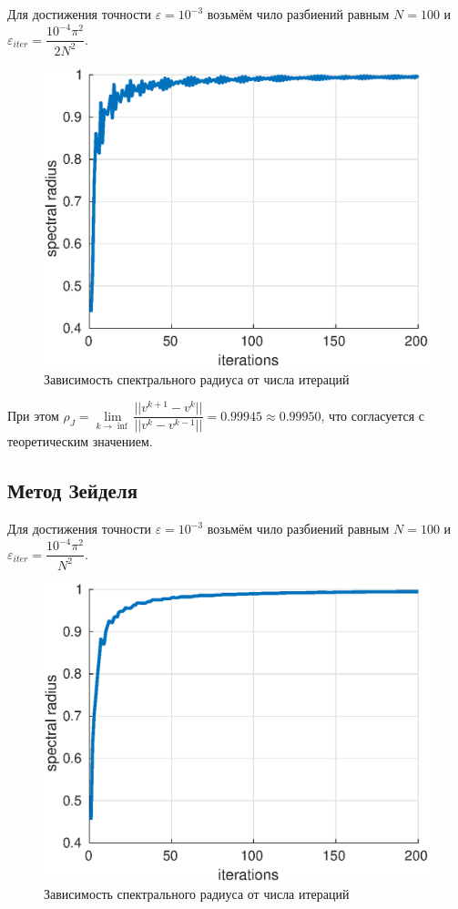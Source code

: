 \documentclass[12pt]{article}
\begin{document}
Для достижения точности $\varepsilon = 10^{-3}$ возьмём чило разбиений равным $N = 100$ и $\varepsilon_{iter} = \dfrac{10^{-4}\pi^2}{2N^2}$. 

\begin{figure}[H]
\centerline{\includegraphics[scale = 0.8]{jacobiSpectre.eps}}
\caption{Зависимость спектрального радиуса от числа итераций}
\end{figure} 

При этом $\rho_{J} = \lim\limits_{k\rightarrow \inf}{\dfrac{||v^{k+1} - v^{k}||}{||v^{k} - v^{k-1}||}} = 0.99945 \approx 0.99950 $, что согласуется с теоретическим значением.
 
\subsection{Метод Зейделя}

Для достижения точности $\varepsilon = 10^{-3}$ возьмём чило разбиений равным $N = 100$ и $\varepsilon_{iter} = \dfrac{10^{-4}\pi^2}{N^2}$. 

\begin{figure}[H]
\centerline{\includegraphics[scale = 0.8]{zeidelSpectre.eps}}
\caption{Зависимость спектрального радиуса от числа итераций}
\end{figure} 
\end{document}
